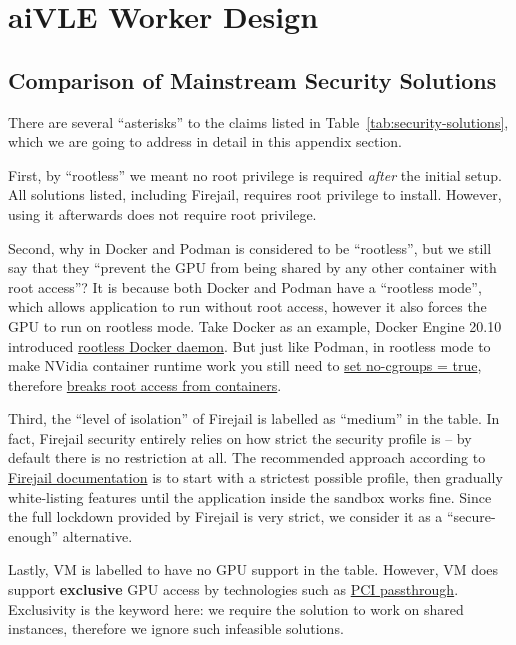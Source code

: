 \chapter{aiVLE Worker Design}
\label{appendix:aivle-worker}

\section{Comparison of Mainstream Security Solutions}
\label{as:comparison-of-security-solutions}

There are several ``asterisks'' to the claims listed in Table~\ref{tab:security-solutions}, which we are going to address in detail in this appendix section. 

First, by ``rootless'' we meant no root privilege is required \emph{after} the initial setup. All solutions listed, including Firejail, requires root privilege to install. However, using it afterwards does not require root privilege.

Second, why in Docker and Podman is considered to be ``rootless'', but we still say that they ``prevent the GPU from being shared by any other container with root access''? It is because both Docker and Podman have a ``rootless mode'', which allows application to run without root access, however it also forces the GPU to run on rootless mode. Take Docker as an example, Docker Engine 20.10 introduced \href{https://docs.docker.com/engine/security/rootless/}{rootless Docker daemon}. But just like Podman, in rootless mode to make NVidia container runtime work you still need to \href{https://www.redhat.com/en/blog/how-use-gpus-containers-bare-metal-rhel-8}{set no-cgroups = true}, therefore \href{https://github.com/NVIDIA/nvidia-container-runtime/issues/85}{breaks root access from containers}.

Third, the ``level of isolation'' of Firejail is labelled as ``medium'' in the table. In fact, Firejail security entirely relies on how strict the security profile is – by default there is no restriction at all. The recommended approach according to \href{https://firejail.wordpress.com/documentation-2/building-custom-profiles/}{Firejail documentation} is to start with a strictest possible profile, then gradually white-listing features until the application inside the sandbox works fine. Since the full lockdown provided by Firejail is very strict, we consider it as a ``secure-enough'' alternative.

Lastly, VM is labelled to have no GPU support in the table. However, VM does support \textbf{exclusive} GPU access by technologies such as \href{https://docs.fedoraproject.org/en-US/Fedora/13/html/Virtualization_Guide/chap-Virtualization-PCI_passthrough.html}{PCI passthrough}. Exclusivity is the keyword here: we require the solution to work on shared instances, therefore we ignore such infeasible solutions.
